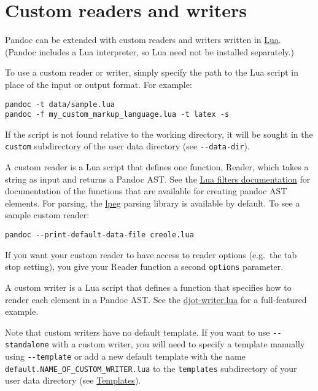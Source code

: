 \documentclass[
  a4paper,
]{article}
\begin{document}
\hypertarget{custom-readers-and-writers}{%
\section{Custom readers and writers}\label{custom-readers-and-writers}}

Pandoc can be extended with custom readers and writers written in
\href{https://www.lua.org}{Lua}. (Pandoc includes a Lua interpreter, so
Lua need not be installed separately.)

To use a custom reader or writer, simply specify the path to the Lua
script in place of the input or output format. For example:

\begin{verbatim}
pandoc -t data/sample.lua
pandoc -f my_custom_markup_language.lua -t latex -s
\end{verbatim}

If the script is not found relative to the working directory, it will be
sought in the \texttt{custom} subdirectory of the user data directory
(see \texttt{-\/-data-dir}).

A custom reader is a Lua script that defines one function, Reader, which
takes a string as input and returns a Pandoc AST. See the
\href{https://pandoc.org/lua-filters.html}{Lua filters documentation}
for documentation of the functions that are available for creating
pandoc AST elements. For parsing, the
\href{http://www.inf.puc-rio.br/~roberto/lpeg/}{lpeg} parsing library is
available by default. To see a sample custom reader:

\begin{verbatim}
pandoc --print-default-data-file creole.lua
\end{verbatim}

If you want your custom reader to have access to reader options
(e.g.~the tab stop setting), you give your Reader function a second
\texttt{options} parameter.

A custom writer is a Lua script that defines a function that specifies
how to render each element in a Pandoc AST. See the
\href{https://github.com/jgm/djot.lua/blob/main/djot-writer.lua}{djot-writer.lua}
for a full-featured example.

Note that custom writers have no default template. If you want to use
\texttt{-\/-standalone} with a custom writer, you will need to specify a
template manually using \texttt{-\/-template} or add a new default
template with the name \texttt{default.NAME\_OF\_CUSTOM\_WRITER.lua} to
the \texttt{templates} subdirectory of your user data directory (see
\protect\hyperlink{templates}{Templates}).
\end{document}
